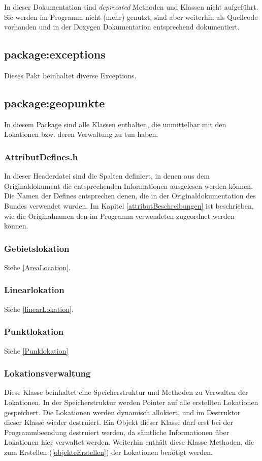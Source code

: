 \documentclass[12pt, a4paper, ngerman]{article}
\begin{document}
In dieser Dokumentation sind \textit{deprecated} Methoden und Klassen nicht aufgeführt. Sie werden im Programm nicht (mehr) genutzt, sind aber weiterhin als Quellcode vorhanden und in der Doxygen Dokumentation entsprechend  dokumentiert.

\subsection{package:exceptions}
Dieses Pakt beinhaltet diverse Exceptions. 

\subsection{package:geopunkte}
In diesem Package sind alle Klassen enthalten, die unmittelbar mit den Lokationen bzw. deren Verwaltung zu tun haben.
\subsubsection{AttributDefines.h}
In dieser Headerdatei sind die Spalten definiert, in denen aus dem Originaldokument die entsprechenden Informationen ausgelesen werden können. Die Namen der Defines entsprechen denen, die in der Originaldokumentation des Bundes verwendet wurden. Im Kapitel \ref{attributBeschreibungen} ist beschrieben, wie die Originalnamen den im Programm verwendeten zugeordnet werden können. 

\subsubsection{Gebietslokation}
Siehe \ref{AreaLocation}.

\subsubsection{Linearlokation}
Siehe \ref{linearLokation}.

\subsubsection{Punktlokation}
Siehe \ref{Punklokation}

\subsubsection{Lokationsverwaltung}
Diese Klasse beinhaltet eine Speicherstruktur und Methoden zu Verwalten der Lokationen. In der Speicherstruktur werden Pointer auf alle erstellten Lokationen gespeichert. Die Lokationen werden dynamisch allokiert, und im Destruktor dieser Klasse wieder destruiert. Ein Objekt dieser Klasse darf erst bei der Programmbeendung destruiert werden, da sämtliche Informationen über Lokationen hier verwaltet werden. Weiterhin enthält diese Klasse Methoden, die zum Erstellen (\ref{objekteErstellen}) der Lokationen benötigt werden.
\end{document}
